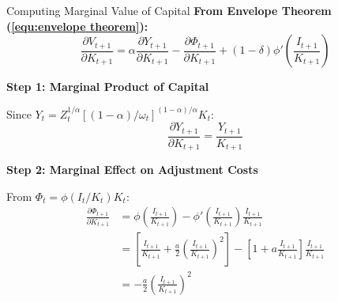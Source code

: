 \documentclass{beamer}
\begin{document}
\begin{frame}{Computing Marginal Value of Capital}
    \textbf{From Envelope Theorem (\ref{equ:envelope theorem}):}
    \begin{equation*}
        \frac{\partial V_{t+1}}{\partial K_{t+1}} = \alpha \frac{\partial Y_{t+1}}{\partial K_{t+1}} - \frac{\partial \Phi_{t+1}}{\partial K_{t+1}} + (1-\delta) \phi'\left(\frac{I_{t+1}}{K_{t+1}}\right)
    \end{equation*}
    
    \textbf{Step 1: Marginal Product of Capital}
    
    Since $Y_t = Z_t^{1/\alpha} [(1-\alpha)/\omega_t]^{(1-\alpha)/\alpha} K_t$:
    \begin{equation*}
        \frac{\partial Y_{t+1}}{\partial K_{t+1}} = \frac{Y_{t+1}}{K_{t+1}}
    \end{equation*}
    
    \textbf{Step 2: Marginal Effect on Adjustment Costs}
    
    From $\Phi_t = \phi(I_t/K_t) K_t$:
    \begin{equation*}
        \begin{aligned}
            \frac{\partial \Phi_{t+1}}{\partial K_{t+1}} &= \phi\left(\frac{I_{t+1}}{K_{t+1}}\right) - \phi'\left(\frac{I_{t+1}}{K_{t+1}}\right) \frac{I_{t+1}}{K_{t+1}} \\
            &= \left[\frac{I_{t+1}}{K_{t+1}} + \frac{a}{2}\left(\frac{I_{t+1}}{K_{t+1}}\right)^2\right] - \left[1 + a\frac{I_{t+1}}{K_{t+1}}\right] \frac{I_{t+1}}{K_{t+1}} \\
            &= -\frac{a}{2}\left(\frac{I_{t+1}}{K_{t+1}}\right)^2
        \end{aligned}
    \end{equation*}
\end{frame}
\end{document}

